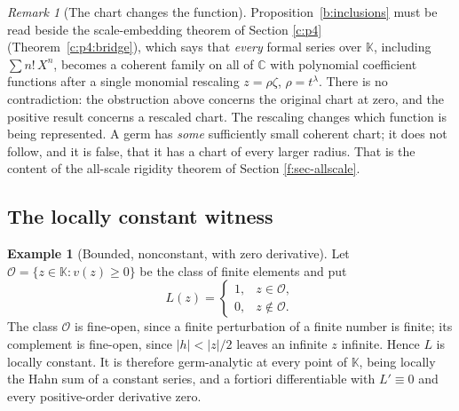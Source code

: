 \documentclass[11pt,a4paper]{article}
\numberwithin{equation}{section}
\theoremstyle{definition}
\newtheorem{example}[theorem]{Example}
\theoremstyle{remark}
\newtheorem{remark}[theorem]{Remark}
\theoremstyle{plain}
\newcommand{\K}{\mathbb K}
\newcommand{\CC}{\mathbb C}
\newcommand{\Ov}{\mathcal O}
\newcommand{\tm}{t}
\newcommand{\abs}[1]{\lvert #1\rvert}
\begin{document}
\begin{remark}[The chart changes the function]
\label{b:chart-changes}
Proposition~\ref{b:inclusions} must be read beside the scale-embedding
theorem of Section \ref{c:p4} (Theorem~\ref{c:p4:bridge}), which says
that \emph{every} formal series over $\K$, including
$\sum n!\,X^{n}$, becomes a coherent family on all of $\CC$ with
polynomial coefficient functions after a single monomial rescaling
$z=\rho\zeta$, $\rho=\tm^{\lambda}$. There is no contradiction: the
obstruction above concerns the original chart at zero, and the positive
result concerns a rescaled chart. The rescaling changes which function is
being represented. A germ has \emph{some} sufficiently small coherent
chart; it does not follow, and it is false, that it has a chart of every
larger radius. That is the content of the all-scale rigidity theorem of
Section \ref{f:sec-allscale}.
\end{remark}

\subsection{The locally constant witness}

\begin{example}[Bounded, nonconstant, with zero derivative]
\label{b:L}
Let $\Ov=\{z\in\K:v(z)\ge0\}$ be the class of finite elements and put
\[
 L(z)=\begin{cases}1,&z\in\Ov,\\[2pt] 0,&z\notin\Ov.\end{cases}
\]
The class $\Ov$ is fine-open, since a finite perturbation of a finite
number is finite; its complement is fine-open, since $\abs h<\abs z/2$
leaves an infinite $z$ infinite. Hence $L$ is locally constant. It is
therefore germ-analytic at every point of $\K$, being locally the Hahn sum
of a constant series, and a fortiori differentiable with
$L'\equiv0$ and every positive-order derivative zero.
\end{example}
\end{document}

